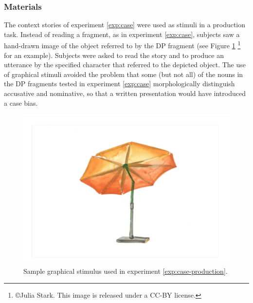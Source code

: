 \subsubsection{Materials}
The context stories of experiment \ref{exp:case} were used as stimuli in a production task. Instead of reading a fragment, as in experiment \ref{exp:case}, subjects saw a hand-drawn image of the object referred to by the DP fragment (see Figure \ref{fig:production-stim}%
\footnote{\copyright Julia Stark. This image is released under a CC-BY license.}\afterfn%
%
for an example). Subjects were asked to read the story and to produce an utterance by the specified character that referred to the depicted object. The use of graphical stimuli avoided the problem that some (but not all) of the nouns in the DP fragments tested in experiment \ref{exp:case} morphologically distinguish accusative and nominative, so that a written presentation would have introduced a case bias.

\begin{figure}[t]
 \includegraphics[scale=.3]{figures/production_sunshade.pdf}
 \caption{Sample graphical stimulus used in experiment \ref{exp:case-production}.\label{fig:production-stim}}
\end{figure}


